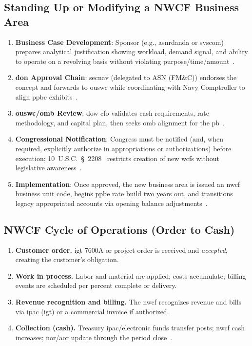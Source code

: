 \documentclass[../main.tex]{subfiles}
\begin{document}
\subsection{Standing Up or Modifying a NWCF Business Area}
\begin{enumerate}
	\item \textbf{Business Case Development}: Sponsor (e.g., \ac{asnrdanda} or \ac{syscom}) prepares analytical justification showing workload, demand signal, and ability to operate on a revolving basis without violating purpose/time/amount~\autocite{DoDFMR-Vol3-Ch19}.
	\item \textbf{\ac{don} Approval Chain}: \ac{secnav} (delegated to ASN (FM\&C)) endorses the concept and forwards to \ac{ouswc} while coordinating with Navy Comptroller to align \ac{ppbe} exhibits~\autocite{DoDFMR-Vol3-Ch19}.
	\item \textbf{\ac{ouswc}/\ac{omb} Review}: \ac{dow} \ac{cfo} validates cash requirements, rate methodology, and capital plan, then seeks \ac{omb} alignment for the \ac{pb}~\autocite{DoDFMR-Vol3-Ch19}.
	\item \textbf{Congressional Notification}: Congress must be notified (and, when required, explicitly authorize in appropriations or authorizations) before execution; 10~U.S.C.~\S~2208~\autocite{USC-2208-NWCF} restricts creation of new \acp{wcf} without legislative awareness~\autocite{DoDFMR-Vol3-Ch19}.
	\item \textbf{Implementation}: Once approved, the new business area is issued an \ac{nwcf} business unit code, begins \ac{ppbe} rate build two years out, and transitions legacy appropriated accounts via opening balance adjustments~\autocite{DoDFMR-Vol3-Ch19}.
\end{enumerate}

\subsection{NWCF Cycle of Operations (Order to Cash)}
\begin{enumerate}
	\item \textbf{Customer order.} \ac{igt} 7600A or project order is received and \emph{accepted}, creating the customer's obligation.
	\item \textbf{Work in process.} Labor and material are applied; costs accumulate; billing events are scheduled per percent complete or delivery.
	\item \textbf{Revenue recognition and billing.} The \ac{nwcf} recognizes revenue and bills via \ac{ipac} (\ac{igt}) or a commercial invoice if authorized.
	\item \textbf{Collection (cash).} Treasury \ac{ipac}/electronic funds transfer posts; \ac{nwcf} cash increases; \ac{nor}/\ac{aor} update through the period close~\autocite{DoDFMR-Vol3,Treasury-GInvoicing}.
\end{enumerate}
\end{document}
